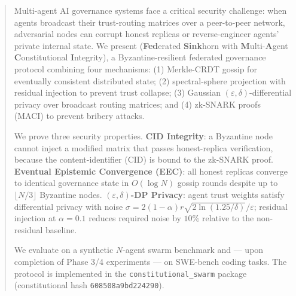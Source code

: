 \begin{abstract}
Multi-agent AI governance systems face a critical security challenge: when agents
broadcast their trust-routing matrices over a peer-to-peer network, adversarial nodes
can corrupt honest replicas or reverse-engineer agents' private internal state.
We present \fedsink{} (\textbf{Fed}erated \textbf{Sink}horn with
\textbf{M}ulti-\textbf{A}gent \textbf{C}onstitutional \textbf{I}ntegrity), a
Byzantine-resilient federated governance protocol combining four mechanisms:
(1) Merkle-CRDT gossip for eventually consistent distributed state;
(2) spectral-sphere projection with residual injection to prevent trust collapse;
(3) Gaussian $(\varepsilon, \delta)$-differential privacy over broadcast routing matrices;
and (4) zk-SNARK proofs (MACI) to prevent bribery attacks.

We prove three security properties.
\textbf{CID Integrity}: a Byzantine node cannot inject a modified matrix that passes
honest-replica verification, because the content-identifier (CID) is bound to the
zk-SNARK proof.
\textbf{Eventual Epistemic Convergence (EEC)}: all honest replicas converge to
identical governance state in $O(\log N)$ gossip rounds despite up to $\lfloor N/3
\rfloor$ Byzantine nodes.
\textbf{$(\varepsilon, \delta)$-DP Privacy}: agent trust weights satisfy differential
privacy with noise $\sigma = 2(1-\alpha)r\sqrt{2\ln(1.25/\delta)}/\varepsilon$; residual
injection at $\alpha{=}0.1$ reduces required noise by $10\%$ relative to the
non-residual baseline.

We evaluate \fedsink{} on a synthetic $N$-agent swarm benchmark and — upon completion
of Phase 3/4 experiments — on SWE-bench coding tasks.
The protocol is implemented in the \texttt{constitutional\_swarm} package
(constitutional hash \texttt{608508a9bd224290}).
\end{abstract}
